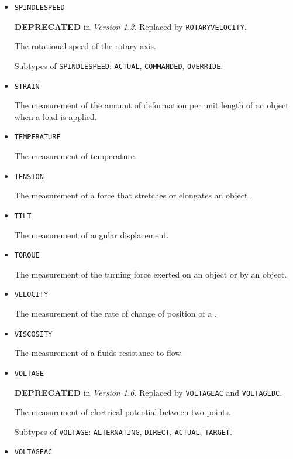 \begin{itemize}
\item \texttt{SPINDLE\textunderscore SPEED}  

\textbf{DEPRECATED} in \textit{Version 1.2}.  Replaced by \texttt{ROTARY\textunderscore VELOCITY}.

The rotational speed of the rotary axis.

Subtypes of \texttt{SPINDLE\textunderscore SPEED}: \texttt{ACTUAL}, \texttt{COMMANDED}, \texttt{OVERRIDE}.

\item \texttt{STRAIN}  

The measurement of the amount of deformation per unit length of an object when a load is applied.


\item \texttt{TEMPERATURE}  

The measurement of temperature.


\item \texttt{TENSION}  

The measurement of a force that stretches or elongates an object.


\item \texttt{TILT}  

The measurement of angular displacement.


\item \texttt{TORQUE}  

The measurement of the turning force exerted on an object or by an object.


\item \texttt{VELOCITY}  

The measurement of the rate of change of position of a .


\item \texttt{VISCOSITY}  

The measurement of a fluids resistance to flow.


\item \texttt{VOLTAGE}  

\textbf{DEPRECATED} in \textit{Version 1.6}. Replaced by \texttt{VOLTAGE\textunderscore AC} and \texttt{VOLTAGE\textunderscore DC}.

The measurement of electrical potential between two points.

Subtypes of \texttt{VOLTAGE}: \texttt{ALTERNATING}, \texttt{DIRECT}, \texttt{ACTUAL}, \texttt{TARGET}.

\item \texttt{VOLTAGE\textunderscore AC}  


\end{itemize}
